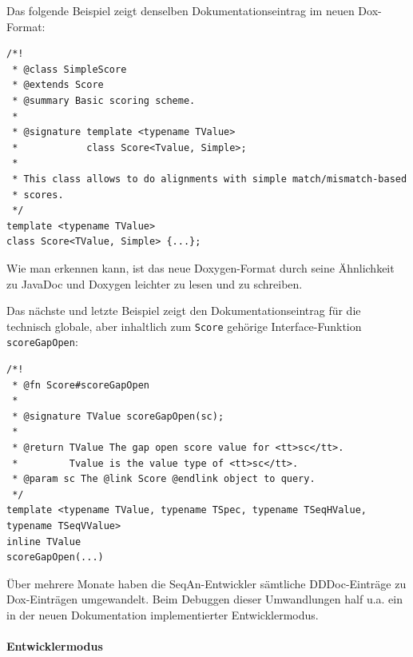 Das folgende Beispiel zeigt denselben Dokumentationseintrag im neuen Dox-Format:

\begin{center}
\begin{verbatim}
/*!
 * @class SimpleScore
 * @extends Score
 * @summary Basic scoring scheme.
 *
 * @signature template <typename TValue>
 *            class Score<Tvalue, Simple>;
 *
 * This class allows to do alignments with simple match/mismatch-based 
 * scores.
 */
template <typename TValue>
class Score<TValue, Simple> {...};
\end{verbatim}
\label{lst:dox}
\end{center}

\bigskip

Wie man erkennen kann, ist das neue Doxygen-Format durch seine Ähnlichkeit zu JavaDoc und Doxygen leichter zu lesen und zu schreiben.

Das nächste und letzte Beispiel zeigt den Dokumentationseintrag für die technisch globale, aber inhaltlich zum \texttt{Score} gehörige Interface-Funktion \texttt{scoreGapOpen}:

\begin{center}
\begin{verbatim}
/*!
 * @fn Score#scoreGapOpen
 *
 * @signature TValue scoreGapOpen(sc);
 *
 * @return TValue The gap open score value for <tt>sc</tt>.
 *         Tvalue is the value type of <tt>sc</tt>.
 * @param sc The @link Score @endlink object to query.
 */
template <typename TValue, typename TSpec, typename TSeqHValue, typename TSeqVValue>
inline TValue
scoreGapOpen(...)
\end{verbatim}
\label{lst:dox2}
\end{center}

\bigskip

Über mehrere Monate haben die SeqAn-Entwickler sämtliche DDDoc-Einträge zu Dox-Einträgen umgewandelt. Beim Debuggen dieser Umwandlungen half u.a. ein in der neuen Dokumentation implementierter Entwicklermodus.



\paragraph{Entwicklermodus}

